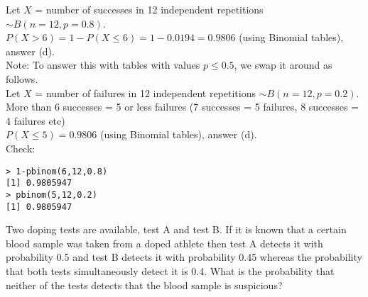 \documentclass[bigtut]{tutorial}
\begin{document}
\begin{tutorial}
\begin{questions}
\begin{solution}
Let $X$ = number of successes in 12 independent repetitions $\sim B(n=12,p=0.8)$. \\
$P(X > 6) = 1- P(X \leq 6) = 1 - 0.0194 = 0.9806$ (using Binomial tables), answer (d). \\

Note: To answer this with tables with values $p \leq 0.5$, we swap it around as follows. \\
Let $X$ = number of failures in 12 independent repetitions $\sim B(n=12,p=0.2)$. \\
More than 6 successes = 5 or less failures (7 successes = 5 failures, 8 successes = 4 failures etc) \\
$P(X \leq 5) = 0.9806$ (using Binomial tables), answer (d). \\

Check:
\begin{verbatim}
> 1-pbinom(6,12,0.8)
[1] 0.9805947
> pbinom(5,12,0.2)
[1] 0.9805947
\end{verbatim}



\end{solution}

\question
Two doping tests are available, test A and test B. If it is known that a certain blood sample was taken from a doped athlete then test A detects it with probability 0.5 and test B detects it with probability 0.45 whereas the probability that both tests simultaneously detect it is 0.4. What is the probability that neither of the tests detects that the blood sample is suspicious?

\end{questions}
\end{tutorial}
\end{document}
